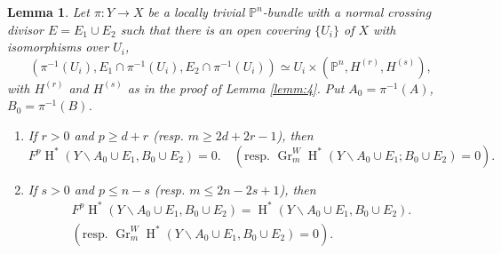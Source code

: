 \documentclass[11pt,a4paper]{amsart}
\renewcommand{\P}{\mathds{P}}
\DeclareMathOperator {\Gr} {Gr}
\DeclareMathOperator{\rH}{H}
\numberwithin{equation}{section}
\theoremstyle{plain}
\newtheorem{lem}[prop]{Lemma}
\theoremstyle{definition}
\begin{document}
\begin{lem} \label{lemm:5}
  Let $\pi
  \colon Y\to X$ be a locally trivial $\P^{n}$-bundle with a
  normal crossing divisor $E=E_{1}\cup E_{2}$ such that there is an open covering
  $\{U_{i}\}$ of $X$  with isomorphisms over $U_{i}$, 
  \begin{displaymath}
    (\pi ^{-1}(U_{i}),E_{1}\cap \pi ^{-1}(U_{i}),E_{2}\cap \pi ^{-1}(U_{i}))\simeq
    U_{i}\times (\P^{n},H^{(r)},H^{(s)}),
  \end{displaymath}
  with $H^{(r)}$ and $H^{(s)}$ as in the proof of Lemma \ref{lemm:4}.
  Put $A_{0}=\pi ^{-1}(A)$, $B_{0}=\pi ^{-1}(B)$.
  \begin{enumerate}
  \item \label{item:1} If $r>0$ and $p\ge d+r$ (resp. $m\ge 2d+2r-1$), then
    \begin{displaymath} 
      F^{p} \rH^{\ast}(Y\smallsetminus A_{0}\cup E_{1},B_{0}\cup E_{2})=0.\quad
      ( \text{resp. }\Gr_{m}^{W} \rH^{\ast}(Y\smallsetminus A_{0}\cup
      E_{1};B_{0}\cup E_{2})=0).
    \end{displaymath}
  \item \label{item:2} If $s>0$  and $p\le n-s$ (resp. $m\le 2n-2s+1$), then 
    \begin{multline*}
      F^{p} \rH^{\ast}(Y\smallsetminus A_{0}\cup E_{1},B_{0}\cup
      E_{2})=\rH^{\ast}(Y\smallsetminus A_{0}\cup E_{1},B_{0}\cup E_{2}).\\ 
      ( \text{resp. }\Gr_{m}^{W} \rH^{\ast}(Y\smallsetminus A_{0}\cup
      E_{1},B_{0}\cup E_{2})=0).
    \end{multline*}
  \end{enumerate}
\end{lem}
\end{document}
